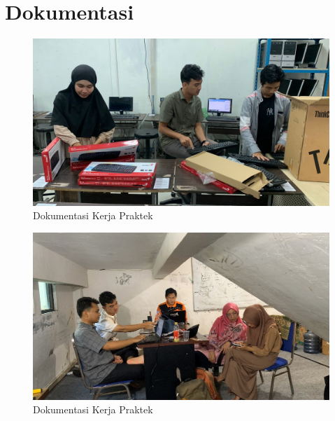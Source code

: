 %


%


\renewcommand{\thepage}{C - \arabic{page}}
\chapter{Dokumentasi}
\begin{figure}
    \centering
    \includegraphics[width=1\linewidth]{konten//gambar/Dokumentasi KP 1.jpg}
    \caption{Dokumentasi Kerja Praktek}
    \label{fig:enter-label}
\end{figure}
\begin{figure}
    \centering
    \includegraphics[width=1\linewidth]{konten//gambar/Dokumentasi KP 2.jpg}
    \caption{Dokumentasi Kerja Praktek}
    \label{fig:enter-label}
\end{figure}
